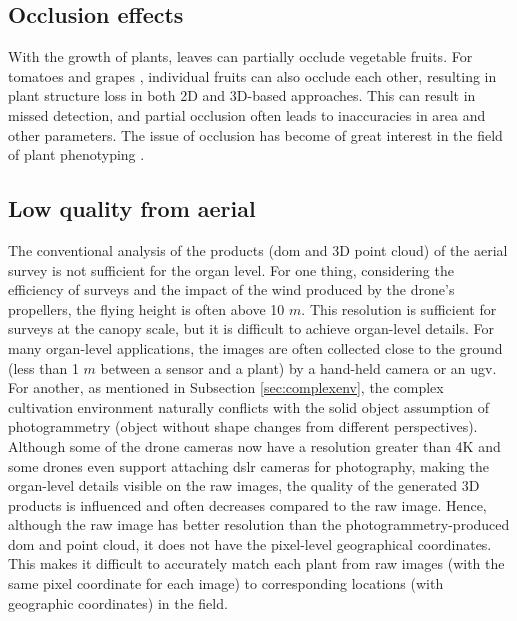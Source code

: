 \subsection{Occlusion effects}
With the growth of plants, leaves can partially occlude vegetable fruits. For tomatoes \citep{yamamoto_plant_2014} and grapes \citep{liang_segmentation_2022}, individual fruits can also occlude each other, resulting in plant structure loss in both 2D and 3D-based approaches. This can result in missed detection, and partial occlusion often leads to inaccuracies in area and other parameters. The issue of occlusion has become of great interest in the field of plant phenotyping \citep{blok_image_2021, boogaard_robust_2020, lehnert_3d_2019}.

\subsection{Low quality from aerial}
The conventional analysis of the products (\gls{dom} and 3D point cloud) of the aerial survey is not sufficient for the organ level. 
For one thing, considering the efficiency of surveys and the impact of the wind produced by the drone's propellers, the flying height is often above 10 $m$. This resolution is sufficient for surveys at the canopy scale, but it is difficult to achieve organ-level details. For many organ-level applications, the images are often collected close to the ground (less than 1 $m$ between a sensor and a plant) by a hand-held camera or an \acrfull{ugv}.
For another, as mentioned in Subsection \ref{sec:complexenv}, the complex cultivation environment naturally conflicts with the solid object assumption of photogrammetry (object without shape changes from different perspectives). Although some of the drone cameras now have a resolution greater than 4K and some drones even support attaching \gls{dslr} cameras for photography, making the organ-level details visible on the raw images, the quality of the generated 3D products is influenced and often decreases compared to the raw image.
Hence, although the raw image has better resolution than the photogrammetry-produced \gls{dom} and point cloud, it does not have the pixel-level geographical coordinates. This makes it difficult to accurately match each plant from raw images (with the same pixel coordinate for each image) to corresponding locations (with geographic coordinates) in the field.
